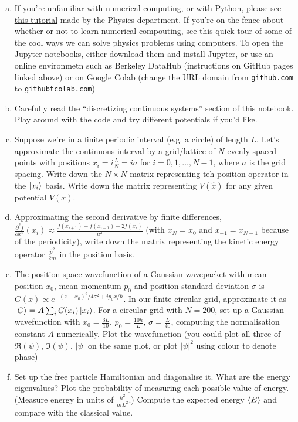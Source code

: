 \documentclass[10pt]{article}
\begin{document}
    \begin{enumerate}[(a)]
        \item If you're unfamiliar with numerical computing, or with Python, please see \href{https://github.com/berkeley-physics/Python-Tutorials}{this tutorial} made by the Physics department. If you're on the fence about whether or not to learn numerical compouting, see \href{https://github.com/berkeley-physics/intro_python}{this quick tour} of some of the cool ways we can solve physics problems using computers. To open the Jupyter notebooks, either download them and install Jupyter, or use an online environmetn such as Berkeley DataHub (instructions on GitHub pages linked above) or on Google Colab (change the URL domain from \texttt{github.com} to \texttt{githubtcolab.com})
        \item Carefully read the ``discretizing continuous systems'' section of this notebook. Play around with the code and try different potentials if you'd like. 
        \item Suppose we're in a finite periodic interval (e.g. a circle) of length $L$. Let's approximate the continuous interval by a grid/lattice of $N$ evenly spaced points with positions $x_i = i\frac{L}{N} = ia$ for $i = 0, 1, \dots, N-1$, where $a$ is the grid spacing. Write down the $N \times N$ matrix representing teh position operator in the $\ket{x_i}$ basis. Write down the matrix representing $V(\hat x)$ for any given potential $V(x)$. 
        \item Approximating the second derivative by finite differences, $\frac{\partial^2 f}{\partial x^2}(x_i) \approx \frac{f(x_{i+1}) + f(x_{i-1}) - 2f(x_i)}{a^2}$ (with $x_N = x_0$ and $x_{-1} = x_{N-1}$ because of the periodicity), write down the matrix representing the kinetic energy operator $\frac{\hat p^2}{2m}$ in the position basis. 
        \item The position space wavefunction of a Gaussian wavepacket with mean position $x_0$, mean momentum $p_0$ and position standard deviation $\sigma$ is $G(x) \propto e^{-(x - x_0)^2/4\sigma^2 + ip_0x/\hbar}$. In our finite circular grid, approximate it as $\ket G = A \sum_i G(x_i) \ket{x_i}$. For a circular grid with $N = 200$, set up a Gaussian wavefunction with $x_0 = \frac{3L}{10}$, $p_0 = \frac{10h}{L}$, $\sigma = \frac{L}{40}$, computing the normalisation constant $A$ numerically. Plot the wavefunction (you could plot all three of $\Re(\psi)$, $\Im(\psi)$, $|\psi|$ on the same plot, or plot $|\psi|^2$ using colour to denote phase)
        \item Set up the free particle Hamiltonian and diagonalise it. What are the energy eigenvalues? Plot the probability of measuring each possible value of energy. (Measure energy in units of $\frac{h^2}{mL^2}$.) Compute the expected energy $\left \langle E \right \rangle$ and compare with the classical value. 

\end{enumerate}
\end{document}
